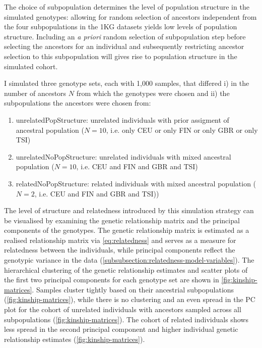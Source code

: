 The choice of subpopulation determines the level of population structure in the simulated genotypes: allowing for random selection of ancestors independent from the four subpopulations in the 1KG datasets yields low levels of population structure. Including an \textit{a priori} random selection of subpopulation step before selecting the ancestors for an individual and subsequently restricting ancestor selection to this subpopulation will gives rise to population structure in the simulated cohort. 

I simulated three genotype sets, each with 1,000 samples, that differed i) in the number of ancestors \(N\) from which the genotypes were chosen and ii) the subpopulations the ancestors were chosen from:
\begin{enumerate}[label=\Alph*.]
\item unrelatedPopStructure: unrelated individuals with prior assigment of ancestral population  (\(N=10\), i.e. only CEU or only FIN or only GBR or only TSI)
\item unrelatedNoPopStructure: unrelated individuals with mixed ancestral population  (\(N=10\), i.e. CEU and FIN and GBR and TSI)
\item relatedNoPopStructure: related individuals with mixed ancestral population (\(N=2\), i.e. CEU and FIN and GBR and TSI))
\end{enumerate}


The level of structure and relatedness introduced by this simulation strategy can be visualised by examining the genetic relationship matrix and the principal components of the genotypes. The genetic relationship matrix is estimated as a realised relationship matrix via \cref{eq:relatedness} and serves as a measure for relatedness between the individuals, while principal components reflect the genotypic variance in the data (\cref{subsubsection:relatedness-model-variables}). The hierarchical clustering of the genetic relationship estimates and scatter plots of the first two principal components for each genotype set are shown in \cref{fig:kinship-matrices}. Samples cluster tightly based on their ancestrial subpopulations (\cref{fig:kinship-matrices}), while there is no clustering and an even spread in the PC plot for the cohort of unrelated individuals with ancestors sampled across all subpopulations (\cref{fig:kinship-matrices}). The cohort of related individuals shows less spread in the second principal component and higher individual genetic relationship  estimates (\cref{fig:kinship-matrices}).


